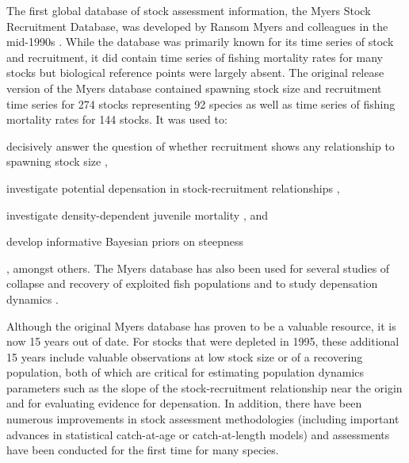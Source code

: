 \documentclass[letterpaper,12pt]{article}
\begin{document}
The first global database of stock assessment information, the Myers
Stock Recruitment Database, was developed by Ransom Myers and
colleagues in the mid-1990s \citep{Myers:etal:1995:summary}.  While
the database was primarily known for its time series of stock and
recruitment, it did contain time series of fishing mortality rates for
many stocks but biological reference points were largely absent. The
original release version of the Myers database
\citep{Myers:etal:1995:summary} contained spawning stock size and recruitment time series
for 274 stocks representing 92 species as well as time series of
fishing mortality rates for 144 stocks. 
It was used to: \begin{inparaenum}[1\upshape)] \item
  decisively answer the question of whether recruitment shows any
  relationship to spawning stock size
  \citep{Myers:Barrowman:1996:fishbull}, \item investigate potential
  depensation in stock-recruitment relationships
  \citep{Myers:etal:1995:science, Liermann:Hilborn:1997:cjfas}, \item
  investigate density-dependent juvenile mortality
  \citep{Myers:2001:ices, Minto:etal:2008:nature}, and \item develop
  informative Bayesian priors on steepness
  \citep{Myers:etal:1999:cjfas, Myers:etal:2002:najfm,
    Dorn:2002:najfm} \end{inparaenum}, amongst others.  The Myers
database has also been used for several studies of collapse and
recovery of exploited fish populations \citep{Hutchings:2000:nature,
  Hutchings:2001:jfishb, Hilborn:1997:csiro} and to study depensation dynamics \citep{Garvey:etal:2009:cjfas}.

Although the original Myers database \citep{Myers:etal:1995:summary}
has proven to be a valuable resource, it is now 15 years out of date.
For stocks that were depleted in 1995, these additional 15 years
include valuable observations at low stock size or of a recovering
population, both of which are critical for estimating population
dynamics parameters such as the slope of the stock-recruitment
relationship near the origin and for evaluating evidence for
depensation. In addition, there have been numerous improvements in
stock assessment methodologies (including important advances in
statistical catch-at-age or catch-at-length models) and assessments
have been conducted for the first time for many species.
\end{document}
